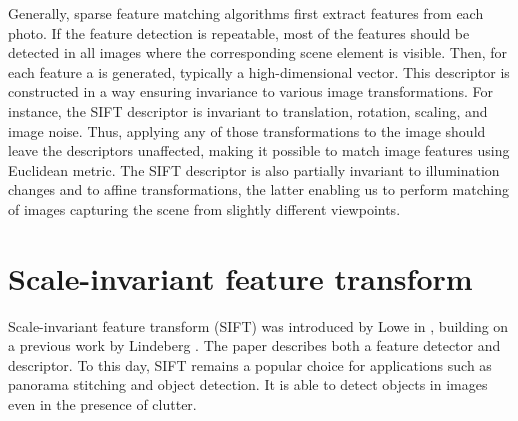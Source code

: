 Generally, sparse feature matching algorithms first extract features from each photo. %
If the feature detection is repeatable, most of the features should be detected in all images where the corresponding scene element is visible.
Then, for each feature a  is generated, typically a high-dimensional vector. 
This descriptor is constructed in a way ensuring invariance to various image transformations. 
For instance, the SIFT descriptor is invariant to translation, rotation, scaling, and image noise. 
Thus, applying any of those transformations to the image should leave the descriptors unaffected, making it possible to match image features using Euclidean metric. 
The SIFT descriptor is also partially invariant to illumination changes and to affine transformations, the latter enabling us to perform matching of images capturing the scene from slightly different viewpoints.
 
 
 
\section{Scale-invariant feature transform}

Scale-invariant feature transform (SIFT) was introduced by Lowe in \cite{lowe1999}, building on a previous work by Lindeberg \cite{lindeberg1998}. 
The paper describes both a feature detector and descriptor. 
To this day, SIFT remains a popular choice for applications such as panorama stitching and object detection. 
It is able to detect objects in images even in the presence of clutter.

